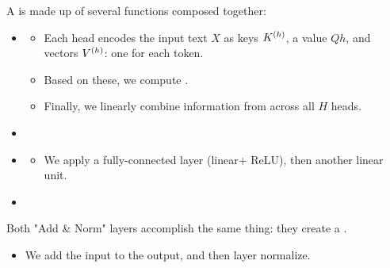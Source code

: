         \begin{definition}
            A  is made up of several functions composed together:

            \begin{itemize}
                \item {}
                
                    \begin{itemize}
                        \item Each head encodes the input text $X$ as keys $K^{(h)}$, a value ${Q}{h}$, and vectors $V^{(h)}$: one for each token.

                        \item Based on these, we compute .

                        \item Finally, we linearly combine information from across all $H$ heads.
                    \end{itemize}

                \item {}

                \item {}

                    \begin{itemize}
                        \item We apply a fully-connected layer (linear+ ReLU), then another linear unit.
                    \end{itemize}

                \item {}
            \end{itemize}

            Both "Add \& Norm" layers accomplish the same thing: they create a .

            \begin{itemize}
                \item We add the input to the output, and then layer normalize.
            \end{itemize}
        \end{definition}

        \phantom{}

